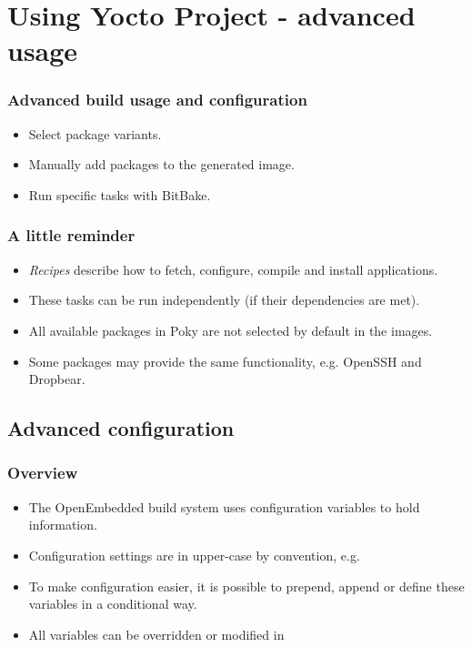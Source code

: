 \section{Using Yocto Project - advanced usage}

\begin{frame}
  \frametitle{Advanced build usage and configuration}
  \begin{itemize}
    \item Select package variants.
    \item Manually add packages to the generated image.
    \item Run specific tasks with BitBake.
  \end{itemize}
\end{frame}

\begin{frame}
  \frametitle{A little reminder}
  \begin{itemize}
    \item {\em Recipes} describe how to fetch, configure, compile and
      install applications.
    \item These tasks can be run independently (if their dependencies
      are met).
    \item All available packages in Poky are not selected by default
      in the images.
    \item Some packages may provide the same functionality, e.g.
      OpenSSH and Dropbear.
  \end{itemize}
\end{frame}

\subsection{Advanced configuration}

\begin{frame}
  \frametitle{Overview}
  \begin{itemize}
    \item The OpenEmbedded build system uses configuration variables
      to hold information.
    \item Configuration settings are in upper-case by convention, e.g.
    \item To make configuration easier, it is possible to prepend,
      append or define these variables in a conditional way.
    \item All variables can be overridden or modified in
  \end{itemize}
\end{frame}

